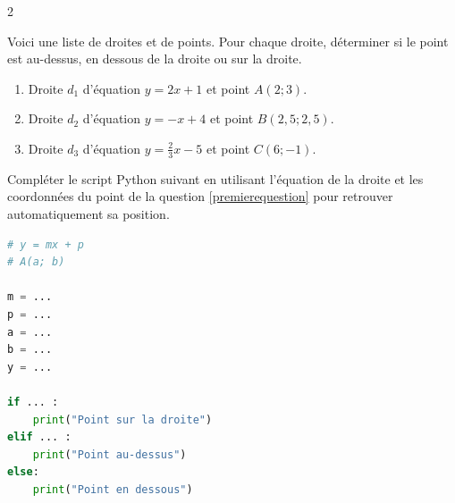 \begin{multicols}{2}
		\begin{MADenumerate}

			\item Voici une liste de droites et de points. Pour chaque droite, déterminer si le point est au-dessus, en dessous de la droite ou sur la droite.

			\begin{enumerate}
				\item Droite $d_1$ d'équation $y=2x+1$ et point $A(2;3)$. \label{premierequestion}
				\item Droite $d_2$ d'équation $y=-x+4$ et point $B(2,5;2,5)$.
				\item  Droite $d_3$ d'équation $y=\frac{2}{3}x-5$ et point $C(6;-1)$.

			\end{enumerate}

			\item Compléter le script Python suivant en utilisant l'équation de la droite et les coordonnées du point de la question \ref{premierequestion} pour retrouver automatiquement sa position.

			\columnbreak

			\begin{lstlisting}[language=Python]
# y = mx + p
# A(a; b) 
  
m = ...
p = ...
a = ...
b = ...
y = ...

if ... :
    print("Point sur la droite")
elif ... :
    print("Point au-dessus")
else:
    print("Point en dessous")

\end{lstlisting}

		\end{MADenumerate}
	\end{multicols}
